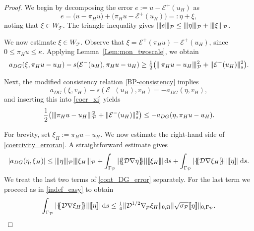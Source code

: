 \documentclass[11pt,final]{amsart}
\theoremstyle{plain}
\theoremstyle{definition}
\newcommand\calP{{\mathcal{P}}}
\newcommand\calT{{\mathcal{T}}}
\newcommand{\mesh}{\calP}
\newcommand{\mean}[1]{\{\kern-1.1mm\{#1\}\kern-1.1mm\}}
\newcommand{\jump}[1]{[\![#1]\!]}                        %
\newcommand{\ud}{\,\mathrm{d}}
\newcommand{\ndgp}[1]{| \kern -.25mm \|{#1}| \kern -.25mm \|_{\rm \mesh}}
\newcommand{\norm}[2]{\|{#1}\|_{{#2}}}
\newcommand{\bnabla}{\nabla_{\kern-.05cm\mesh}^{}}
\begin{document}
\begin{proof}
We begin by decomposing the error $e:=u-\mathcal{E}^+(u_H)$ as
\[
e=\big(u-\pi_H u\big) +\big( \pi_H u - \mathcal{E}^+(u_H)\big) =: \eta+\xi,
\]
noting that $\xi\in W_\calT$. The triangle inequality gives
$\ndgp{e}\le \ndgp{\eta}+\ndgp{\xi}$.

We now estimate $\xi\in W_\calT$. Observe that
$\xi = \mathcal{E}^+(\pi_H u)-\mathcal{E}^+(u_H)$, since
$0\le \pi_H u\le \kappa$.  
Applying Lemma~\ref{Lem:mon_twoscale}, we obtain
\begin{equation}\label{coer_xi}
  \begin{aligned}
    a_{DG}(\xi,\pi_H u-u_H)-s(\mathcal{E}^-(u_H),\pi_H u-u_H) \ge \tfrac{1}{2}\big(\ndgp{\pi_H u-u_H}^2+\norm{\mathcal{E}^-(u_H)}{s}^2\big).
  \end{aligned}
\end{equation}

Next, the modified consistency relation \eqref{BP-consistency} implies
\begin{equation}\label{GO2}
	a_{DG}(\xi,v_H) -s(\mathcal{E}^-(u_H),v_H)=-a_{DG}(\eta,v_H),
\end{equation}
and inserting this into \eqref{coer_xi} yields
\begin{equation}\label{coercivity_erroran}
\frac{1}{2}\big(\ndgp{\pi_H u-u_H}^2+\norm{\mathcal{E}^-(u_H)}{s}^2\big)\le  -a_{DG}(\eta,\pi_H u-u_H). 
\end{equation}

For brevity, set $\xi_H:=\pi_H u-u_H$. We now estimate the right-hand
side of \eqref{coercivity_erroran}. A straightforward estimate gives
\begin{equation}\label{cont_DG_error}
  |a_{DG}(\eta,\xi_H)|\le \ndgp{\eta}\ndgp{\xi_H}+\int_{\Gamma_\mesh}|\mean{\mathcal{D}\nabla \eta}| |\jump{\xi_H}|\ud s +\int_{\Gamma_\mesh}|\mean{\mathcal{D}\nabla \xi_H}| |\jump{\eta}|\ud s. 
\end{equation}
We treat the last two terms of \eqref{cont_DG_error} separately. For
the last term we proceed as in \eqref{indef_easy} to obtain
\[
\int_{\Gamma_\mesh}|\mean{\mathcal{D}\nabla \xi_H}| |\jump{\eta}|\ud s \le \tfrac{1}{4}\norm{\mathcal{D}^{1/2}\bnabla \xi_H}{0,\Omega}\norm{\sqrt{\sigma_\mesh}\jump{\eta}}{0,\Gamma_\mesh}.
\]


\end{proof}
\end{document}
